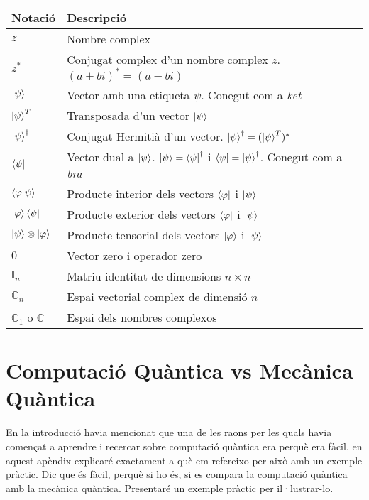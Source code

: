 \begin{tabular}{ p{2cm}|p{12cm} }
	\hline
	Notació & Descripció\\
	\hline
	\hline
	$z$ & Nombre complex \\
	$z^{*}$ & Conjugat complex d'un nombre complex $z$. $(a+ bi)^{*} = (a -bi)$\\
	$\ket{\psi} $ & Vector amb una etiqueta $\psi$. Conegut com a \textit{ket}\\
	$\ket{\psi}^T$ & Transposada d'un vector $\ket{\psi}$ \\
	$\ket{\psi}^\dag $ & Conjugat Hermitià d'un vector. $\ket{\psi}^\dag = (\ket{\psi}^T)^* $\\
	$\bra{\psi} $ & Vector dual a $\ket{\psi}$. $ \ket{\psi} = \bra{\psi}^{\dag}$ i $\bra{\psi} = \ket{\psi}^\dag$. Conegut com a \textit{bra}\\
	$ \bra{\varphi}\ket{\psi} $ & Producte interior dels vectors $\bra{\varphi}$ i $\ket{\psi}$ \\
	$ \ket{\varphi}\bra{\psi} $ & Producte exterior dels vectors $\bra{\varphi}$ i $\ket{\psi}$ \\
	$ \ket{\psi}\otimes\ket{\varphi}$ & Producte tensorial dels vectors $\ket{\varphi}$ i $\ket{\psi}$ \\
	$ 0 $ & Vector zero i operador zero \\
	$ \mathbb{I}_n $ & Matriu identitat de dimensions $n\times n$ \\
	$ \mathbb{C}_n $ & Espai vectorial complex de dimensió $n$ \\
	$ \mathbb{C}_1$ o $\mathbb{C} $ & Espai dels nombres complexos \\
	
\end{tabular}




\chapter{Computació Quàntica vs Mecànica Quàntica}
En la introducció havia mencionat que una de les raons per les quals havia començat a aprendre i recercar sobre computació quàntica era perquè era fàcil, en aquest apèndix explicaré exactament a què em refereixo per això amb un exemple pràctic. Dic que és fàcil, perquè si ho és, si es compara la computació quàntica amb la mecànica quàntica. Presentaré un exemple pràctic per il·lustrar-lo.

